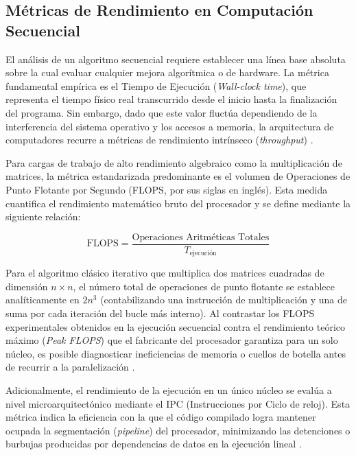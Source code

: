 \subsection{Métricas de Rendimiento en Computación Secuencial}
El análisis de un algoritmo secuencial requiere establecer una línea base absoluta sobre la cual evaluar cualquier mejora algorítmica o de hardware. La métrica fundamental empírica es el Tiempo de Ejecución (\textit{Wall-clock time}), que representa el tiempo físico real transcurrido desde el inicio hasta la finalización del programa. Sin embargo, dado que este valor fluctúa dependiendo de la interferencia del sistema operativo y los accesos a memoria, la arquitectura de computadores recurre a métricas de rendimiento intrínseco (\textit{throughput}) \parencite{Patterson2017Computer}.

Para cargas de trabajo de alto rendimiento algebraico como la multiplicación de matrices, la métrica estandarizada predominante es el volumen de Operaciones de Punto Flotante por Segundo (FLOPS, por sus siglas en inglés). Esta medida cuantifica el rendimiento matemático bruto del procesador y se define mediante la siguiente relación:

\begin{equation}
    \text{FLOPS} = \frac{\text{Operaciones Aritméticas Totales}}{T_{\text{ejecución}}}
\end{equation}

Para el algoritmo clásico iterativo que multiplica dos matrices cuadradas de dimensión \(n \times n\), el número total de operaciones de punto flotante se establece analíticamente en \(2n^3\) (contabilizando una instrucción de multiplicación y una de suma por cada iteración del bucle más interno). Al contrastar los FLOPS experimentales obtenidos en la ejecución secuencial contra el rendimiento teórico máximo (\textit{Peak FLOPS}) que el fabricante del procesador garantiza para un solo núcleo, es posible diagnosticar ineficiencias de memoria o cuellos de botella antes de recurrir a la paralelización \parencite{Hager2010HPC}. 

Adicionalmente, el rendimiento de la ejecución en un único núcleo se evalúa a nivel microarquitectónico mediante el IPC (Instrucciones por Ciclo de reloj). Esta métrica indica la eficiencia con la que el código compilado logra mantener ocupada la segmentación (\textit{pipeline}) del procesador, minimizando las detenciones o burbujas producidas por dependencias de datos en la ejecución lineal \parencite{Yi2020CPI}.


